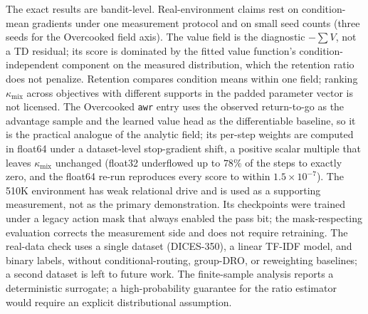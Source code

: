 \documentclass{article}
\newcommand{\kmix}{\kappa_{\mathrm{mix}}}
\begin{document}
The exact results are bandit-level. Real-environment claims rest on
condition-mean gradients under one measurement protocol and on small seed
counts (three seeds for the Overcooked field axis). The value field is the
diagnostic $-\sum V$, not a TD residual; its score is dominated by the fitted
value function's condition-independent component on the measured
distribution, which the retention ratio does not penalize. Retention compares
condition means within one field; ranking $\kmix$ across objectives with
different supports in the padded parameter vector is not licensed. The Overcooked
\texttt{awr} entry uses the observed return-to-go as the advantage sample and
the learned value head as the differentiable baseline, so it is the practical
analogue of the analytic field; its per-step weights are computed in float64
under a dataset-level stop-gradient shift, a positive scalar multiple that
leaves $\kmix$ unchanged (float32 underflowed up to $78\%$ of the steps to
exactly zero, and the float64 re-run reproduces every score to within
$1.5\times10^{-7}$). The 510K environment has
weak relational drive and is used as a supporting measurement, not as the
primary demonstration. Its checkpoints were trained under a legacy action mask
that always enabled the pass bit; the mask-respecting evaluation corrects the
measurement side and does not require retraining. The real-data check uses a
single dataset (DICES-350), a linear TF-IDF model, and binary labels, without
conditional-routing, group-DRO, or reweighting baselines; a second dataset is
left to future work. The finite-sample analysis reports a
deterministic surrogate; a high-probability guarantee for the ratio estimator
would require an explicit distributional assumption.
\end{document}
